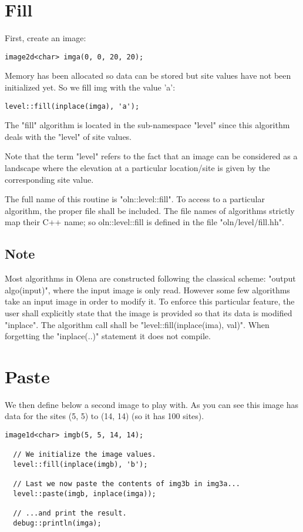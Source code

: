 \documentclass{report}
\begin{document}
\section{Fill}
First, create an image:
\begin{lstlisting}[frame=single]
  image2d<char> imga(0, 0, 20, 20);
\end{lstlisting}

Memory has been allocated so data can be stored but site values
have not been initialized yet.  So we fill img with the value 'a':
\begin{lstlisting}[frame=single]
  level::fill(inplace(imga), 'a');
\end{lstlisting}

The "fill" algorithm is located in the sub-namespace "level" since this
algorithm deals with the "level" of site values.

Note that the term "level" refers to the fact that an image can be considered as
a landscape where the elevation at a particular location/site is given by
the corresponding site value.

The full name of this routine is "oln::level::fill".  To access to a particular
algorithm, the proper file shall be included. The file names of algorithms
strictly map their C++ name; so oln::level::fill is defined in the file
"oln/level/fill.hh".

\subsection*{Note}
Most algorithms in Olena are constructed following the classical scheme: "output
algo(input)", where the input image is only read. However some few algorithms
take an input image in order to modify it.  To enforce this particular feature,
the user shall explicitly state that the image is provided so that its data is
modified "inplace". The algorithm call shall be "level::fill(inplace(ima),
val)". When forgetting the "inplace(..)" statement it does not compile.


\section{Paste}
We then define below a second image to play with.  As you can see this image has
data for the sites (5, 5) to (14, 14) (so it has 100 sites).  

\begin{lstlisting}[frame=single]
  image1d<char> imgb(5, 5, 14, 14);

  // We initialize the image values.
  level::fill(inplace(imgb), 'b');

  // Last we now paste the contents of img3b in img3a...
  level::paste(imgb, inplace(imga));

  // ...and print the result.
  debug::println(imga);
\end{lstlisting}
\end{document}
